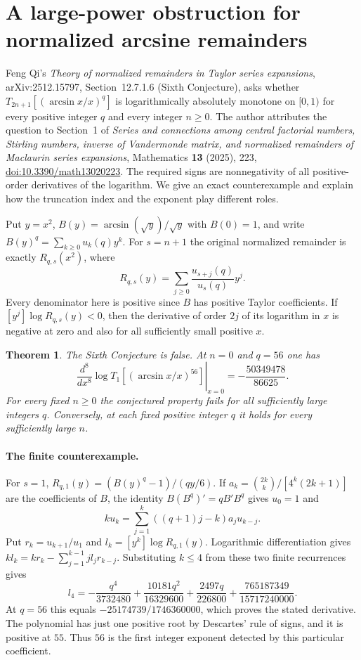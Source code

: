 \documentclass[11pt,a4paper]{article}
\newtheorem{theorem}{Theorem}[section]
\numberwithin{equation}{section}
\begin{document}
\section{A large-power obstruction for normalized arcsine remainders}
\label{qi6:sec}

Feng Qi's \emph{Theory of normalized remainders in Taylor series
expansions}, arXiv:2512.15797, Section~12.7.1.6 (Sixth Conjecture),
asks whether $T_{2n+1}[(\arcsin x/x)^q]$ is logarithmically absolutely
monotone on $[0,1)$ for every positive integer $q$ and every integer
$n\ge0$. The author attributes the question to Section~1 of
\emph{Series and connections among central factorial numbers, Stirling
numbers, inverse of Vandermonde matrix, and normalized remainders of
Maclaurin series expansions}, Mathematics \textbf{13} (2025), 223,
\href{https://doi.org/10.3390/math13020223}{doi:10.3390/math13020223}.
The required signs are nonnegativity of all positive-order derivatives
of the logarithm. We give an exact counterexample and explain how
the truncation index and the exponent play different roles.

Put $y=x^2$, $B(y)=\arcsin(\sqrt y)/\sqrt y$ with $B(0)=1$, and
write $B(y)^q=\sum_{k\ge0}u_k(q)y^k$. For $s=n+1$ the original
normalized remainder is exactly $R_{q,s}(x^2)$, where
\[
 R_{q,s}(y)=\sum_{j\ge0}\frac{u_{s+j}(q)}{u_s(q)}y^j.
\]
Every denominator here is positive since $B$ has positive Taylor
coefficients. If $[y^j]\log R_{q,s}(y)<0$, then the derivative of
order $2j$ of its logarithm in $x$ is negative at zero and also
for all sufficiently small positive $x$.

\begin{theorem}\label{qi6:main}
The Sixth Conjecture is false. At $n=0$ and $q=56$ one has
\[
 \left.\frac{d^8}{dx^8}\log T_1[(\arcsin x/x)^{56}]\right|_{x=0}
 =-\frac{50349478}{86625}.
\]
For every fixed $n\ge0$ the conjectured property fails for all
sufficiently large integers $q$. Conversely, at each fixed positive
integer $q$ it holds for every sufficiently large $n$.
\end{theorem}

\paragraph{The finite counterexample.}
For $s=1$, $R_{q,1}(y)=(B(y)^q-1)/(qy/6)$. If
$a_k=\binom{2k}{k}/[4^k(2k+1)]$ are the coefficients of $B$, the
identity $B(B^q)'=qB'B^q$ gives $u_0=1$ and
\[
 ku_k=\sum_{j=1}^k ((q+1)j-k)a_j u_{k-j}.
\]
Put $r_k=u_{k+1}/u_1$ and $l_k=[y^k]\log R_{q,1}(y)$.
Logarithmic differentiation gives
$kl_k=kr_k-\sum_{j=1}^{k-1}jl_jr_{k-j}$. Substituting $k\le4$
from these two finite recurrences gives
\[
 l_4=-\frac{q^4}{3732480}+\frac{10181q^2}{16329600}
       +\frac{2497q}{226800}+\frac{765187349}{15717240000}.
\]
At $q=56$ this equals $-25174739/1746360000$, which proves the
stated derivative. The polynomial has just one positive root by
Descartes' rule of signs, and it is positive at $55$. Thus $56$ is
the first integer exponent detected by this particular coefficient.
\end{document}
